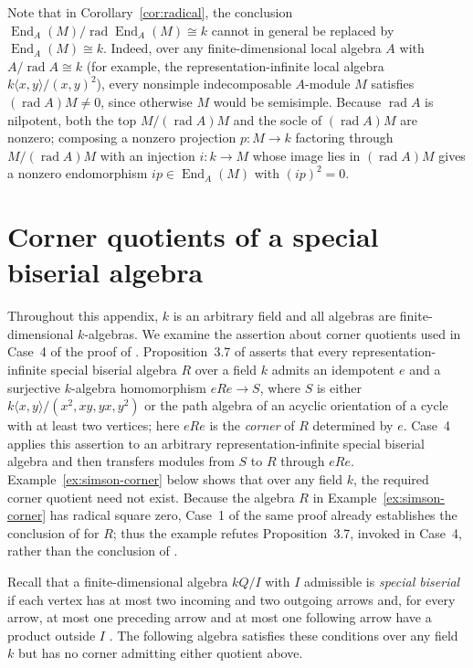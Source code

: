 \documentclass[a4paper,reqno,10pt]{amsart}
\theoremstyle{definition}
\DeclareMathOperator{\End}{End}
\DeclareMathOperator{\rad}{rad}
\numberwithin{equation}{section}
\begin{document}
Note that in Corollary~\ref{cor:radical}, the conclusion
$\End_A(M)/\rad\End_A(M)\cong k$ cannot in general be replaced by $\End_A(M)\cong k$.
Indeed, over any finite-dimensional local algebra $A$ with $A/\rad A\cong k$ (for example, the representation-infinite local algebra $k\langle x,y\rangle/(x,y)^2$), every nonsimple indecomposable $A$-module $M$ satisfies
$(\rad A)M\ne0$, since otherwise $M$ would be semisimple. Because $\rad A$ is nilpotent, both the top $M/(\rad A)M$
and the socle of $(\rad A)M$ are nonzero; composing a nonzero projection
$p:M\to k$ factoring through $M/(\rad A)M$ with an injection $i:k\to M$ whose image lies in
$(\rad A)M$ gives a nonzero endomorphism $ip\in\End_A(M)$ with $(ip)^2=0$.

\appendix
\section{Corner quotients of a special biserial algebra}
\label{sec:simson-counterexample}
Throughout this appendix, $k$ is an arbitrary field and all algebras are
finite-dimensional $k$-algebras.
We examine the assertion about corner quotients used in Case~4 of the proof of
\cite[Theorem~3.1, pp.~128--129]{SimsonCorner}.
Proposition~3.7 of \cite{SimsonCorner}
asserts that every representation-infinite special biserial algebra $R$
over a field $k$ admits an idempotent $e$ and a surjective $k$-algebra homomorphism
$eRe\to S$, where $S$ is either
$k\langle x,y\rangle/(x^2,xy,yx,y^2)$ or the path algebra of an acyclic
orientation of a cycle with at least two vertices; here $eRe$ is the
\emph{corner} of $R$ determined by $e$. Case~4 applies this assertion
to an arbitrary representation-infinite special biserial algebra and then
transfers modules from $S$ to $R$ through $eRe$.
Example~\ref{ex:simson-corner} below shows that over any field $k$, the required corner quotient
need not exist. Because the algebra $R$ in Example~\ref{ex:simson-corner} has radical square
zero, Case~1 of the same proof already establishes the conclusion of \cite[Theorem~3.1]{SimsonCorner} for $R$; thus the example refutes Proposition~3.7, invoked in Case~4,
rather than the conclusion of \cite[Theorem~3.1]{SimsonCorner}.

Recall that a finite-dimensional algebra $kQ/I$ with $I$ admissible is
\emph{special biserial} if each vertex has at most two incoming and two
outgoing arrows and, for every arrow, at most one preceding arrow and
at most one following arrow have a product outside $I$
\cite[p.~124, (SP1)--(SP2)]{SimsonCorner}.
The following algebra satisfies these conditions over any field $k$ but has no corner
admitting either quotient above.
\end{document}
